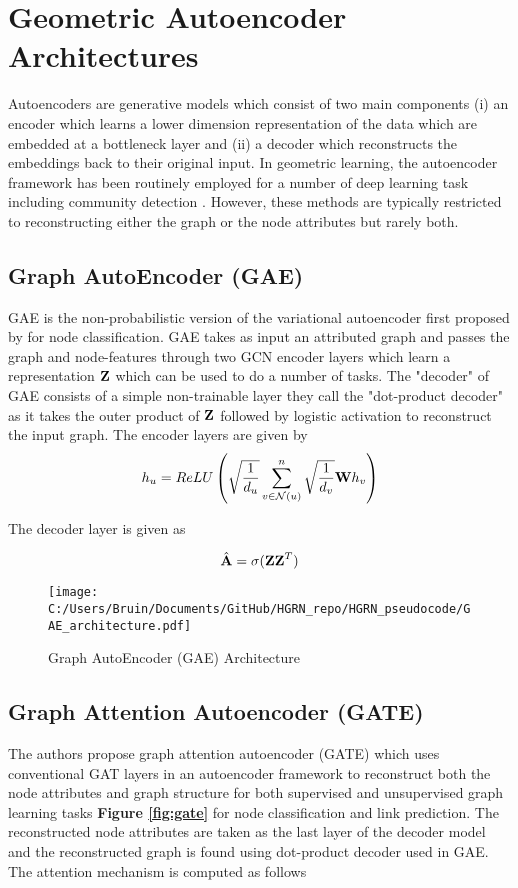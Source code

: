 \documentclass[a4paper,12pt]{article}
\begin{document}
	
	\section{Geometric Autoencoder Architectures}
	Autoencoders are generative models which consist of two main components (i) an encoder which learns a lower dimension representation of the data which are embedded at a bottleneck layer and (ii) a decoder which reconstructs the embeddings back to their original input. In geometric learning, the autoencoder framework has been routinely employed for a number of deep learning task including community detection \cite{kipf2016variational,wang2017mgae,zhou2023community,wang2021scgnn}. However, these methods are typically restricted to reconstructing either the graph or the node attributes but rarely both.  
	\subsection{Graph AutoEncoder (GAE)}
	GAE is the non-probabilistic version of the variational autoencoder first proposed by \cite{kipf2016variational} for node classification. GAE takes as input an attributed graph and passes the graph and node-features through two GCN encoder layers which learn a representation $\bf Z$ which can be used to do a number of tasks. The "decoder" of GAE consists of a simple non-trainable layer they call the "dot-product decoder" as it takes the outer product of $\bf Z$ followed by logistic activation to reconstruct the input graph.  The encoder layers are given by 
	\[ h_u =  ReLU\left(\sqrt{\frac{1}{d_u}}\sum_{v\in \mathcal{N}(u)}^n \sqrt{\frac{1}{d_v}} {\bf W}h_v\right)\]
	
	The decoder layer is given as
	
	\[ \hat{\bf A} = \sigma({\bf ZZ}^T) \]
	\begin{figure}[H]
		\centering
		\caption{Graph AutoEncoder (GAE) Architecture}
		\texttt{[image: C:/Users/Bruin/Documents/GitHub/HGRN\_repo/HGRN\_pseudocode/GAE\_architecture.pdf]}
		\label{fig:gae_mod}
	\end{figure}
	
	
	
	\subsection{Graph Attention Autoencoder (GATE)}
	The authors \cite{salehi2019graph} propose graph attention autoencoder (GATE) which uses conventional GAT layers in an autoencoder framework to reconstruct both the node attributes and graph structure for both supervised and unsupervised graph learning tasks \textbf{Figure \ref{fig:gate}} for node classification and link prediction. The reconstructed node attributes are taken as the last layer of the decoder model and the reconstructed graph is found using dot-product decoder used in GAE. The attention mechanism is computed as follows
	
\end{document}
